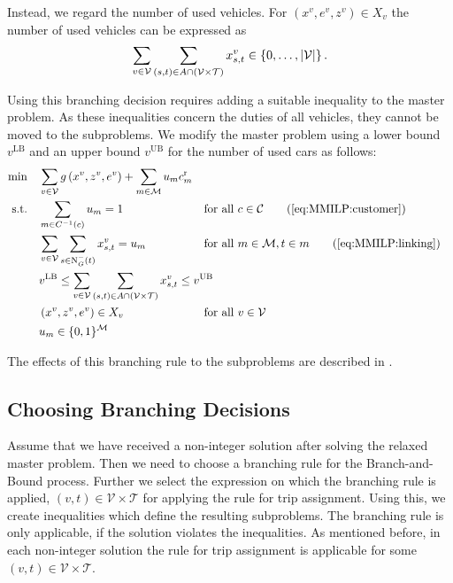 Instead, we regard the number of used vehicles. For ${\left(x^v,e^v,z^v\right)\in X_v}$ the number of used vehicles can be expressed as
\begin{align*}
	\sum_{v\in\mathcal{V}}\sum_{(s,t)\in A\cap\left(\mathcal{V}\times\mathcal{T}\right)} x^v_{s,t}\in\left\{0,\dots,\vert\mathcal{V}\vert\right\}.
\end{align*}

Using this branching decision requires adding a suitable inequality to the master problem. As these inequalities concern the duties of all vehicles, they cannot be moved to the subproblems. We modify the master problem using a lower bound $v^{\operatorname{LB}}$ and an upper bound $v^{\operatorname{UB}}$ for the number of used cars as follows:
\begin{align}
	\min \quad & \sum_{v\in\mathcal{V}}g\left(x^v,z^v,e^v\right) + \sum_{m\in\mathcal{M}} u_m \croute_m \nonumber \\
	\text{s.t.} \quad & \sum_{m\in C^{-1}(c)} u_m = 1 && \text{for all } c\in\mathcal{C} \tag{\ref{eq:MMILP:customer}} \\
	& \sum_{v\in\mathcal{V}}\sum_{s\in\Nin(t)}x^v_{s,t} = u_m && \text{for all } m\in\mathcal{M},t\in m \tag{\ref{eq:MMILP:linking}} \\
	& \omit\rlap{$\displaystyle{v^{\operatorname{LB}} \leq \sum_{\vinV}\sum_{(s,t)\in A\cap\left(\mathcal{V}\times\mathcal{T}\right)} x^v_{s,t} \leq v^{\operatorname{UB}}}$} \label{eq:MMILP:used_vehicles} \\
	& \left(x^v,z^v,e^v\right)\in X_v && \text{for all } v\in\mathcal{V} \nonumber \\
	& u_m\in\{0,1\}^{\mathcal{M}} \nonumber
\end{align}

The effects of this branching rule to the subproblems are described in \cite[p.~122-123]{Kaiser}.

\newpage


\subsection{Choosing Branching Decisions}

Assume that we have received a non-integer solution after solving the relaxed master problem. Then we need to choose a branching rule for the Branch-and-Bound process. Further we select the expression on which the branching rule is applied, \eg ${(v,t)\in\mathcal{V}\times\mathcal{T}}$ for applying the rule for trip assignment. Using this, we create inequalities which define the resulting subproblems. The branching rule is only applicable, if the solution violates the inequalities. As mentioned before, in each non-integer solution the rule for trip assignment is applicable for some ${(v,t) \in\mathcal{V}\times\mathcal{T}}$.

